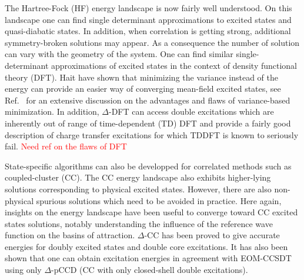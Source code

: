 \documentclass[aps,prb,reprint,showkeys,superscriptaddress]{revtex4-1}
\newcommand{\todo}[1]{\textcolor{red}{#1}}
\begin{document}
The Hartree-Fock (HF) \cite{Szabo_1996} energy landscape is now fairly well understood.\cite{Thompson_2018,Dong_2020,Burton_2021}
On this landscape one can find single determinant approximations to excited states \cite{Gilbert_2008,Barca_2014} and quasi-diabatic states. \cite{Thom_2009}
In addition, when correlation is getting strong, additional symmetry-broken solutions may appear.\cite{Coulson_1949}
As a consequence the number of solution can vary with the geometry of the system.
One can find similar single-determinant approximations of excited states in the context of density functional theory (DFT). \cite{Hait_2020,Hait_2021}
Hait \etal have shown that minimizing the variance instead of the energy can provide an easier way of converging mean-field excited states, \cite{Hait_2020} see Ref.~ for an extensive discussion on the advantages and flaws of variance-based minimization.
In addition, $\Delta$-DFT can access double excitations which are inherently out of range of time-dependent (TD) DFT \cite{Hait_2021} and provide a fairly good description of charge transfer excitations for which TDDFT is known to seriously fail. \cite{Hait_2021} \todo{Need ref on the flaws of DFT}

State-specific algorithms can also be developped for correlated methods such as coupled-cluster (CC). \cite{Shavitt_2009}
The CC energy landscape also exhibits higher-lying solutions corresponding to physical excited states. \cite{Jankowski_1994,Jankowski_1994a,Piecuch_2000,Mayhall_2010,Lee_2019,Kossoski_2021}
However, there are also non-physical spurious solutions which need to be avoided in practice. \cite{Jankowski_1994,Jankowski_1994a,Piecuch_2000,Mayhall_2010,Kossoski_2021,Marie_2021a}
Here again, insights on the energy landscape have been useful to converge toward CC excited states solutions, notably understanding the influence of the reference wave function on the basins of attraction. \cite{Jankowski_1995,Lee_2019,Marie_2021a}
$\Delta$-CC has been proved to give accurate energies for doubly excited states and double core excitations. \cite{Lee_2019}
It has also been shown that one can obtain excitation energies in agreement with EOM-CCSDT using only $\Delta$-pCCD (CC with only closed-shell double excitations). \cite{Kossoski_2021}
\end{document}

